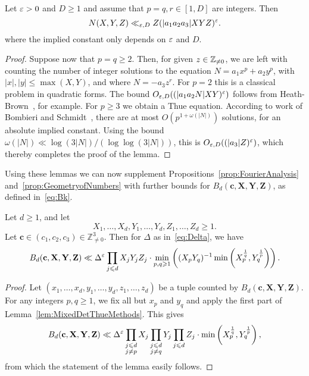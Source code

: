 \begin{lemma}\label{lem:MixedThueMethods}
  Let $\varepsilon>0$ and $D\geq 1$ and
  assume that $p=q,r\in [1,D]$ are integers. Then
  \[
  N(X,Y,Z)\ll_{\varepsilon,D} Z (|a_1a_2a_3|XYZ)^\varepsilon.
  \]
  where the implied constant only depends on $\varepsilon$ and $D$.
  \end{lemma}
\begin{proof}
 Suppose now that $p=q\geq 2$. Then, for given $z\in \mathbb{Z}_{\neq 0}$, we are left with counting the number of integer solutions to the equation $N=a_1x^p+a_2y^p$, with $|x|,|y|\leq \max(X,Y)$, and
 where $N=-a_3z^r$. For $p=2$ this is a classical problem in quadratic forms. The
bound $O_{\varepsilon,D}((|a_1a_2N|XY)^\varepsilon)$ follows from Heath-Brown~\cite[Theorem~3]{cubic}, for example.
 For $p\geq 3$ we obtain a Thue equation. According to work of Bombieri and Schmidt~\cite{bs}, there are at most $O(p^{1+\omega(|N|)})$ solutions, for an absolute implied constant. Using the bound $\omega(|N|)\ll \log(3|N|)/(\log \log(3|N|))$, this is $O_{\varepsilon,D}((|a_3|Z)^\varepsilon)$, which thereby completes the proof of the lemma.
 \end{proof}


Using these lemmas we can now supplement Propositions~\ref{prop:FourierAnalysis}
and~\ref{prop:GeometryofNumbers} with further bounds
for $B_d(\mathbf{c},\mathbf{X},\mathbf{Y},\mathbf{Z})$, as defined in~\eqref{eq:Bk}.


\begin{proposition}\label{prop:DeterminantMethod}
Let $d\geq 1$, and let
\[
X_1,\ldots, X_d, Y_1,\ldots, Y_d,Z_1,\ldots, Z_d\geq 1.
\]
Let $\mathbf{c}\in (c_1,c_2,c_3)\in \mathbb{Z}_{\neq 0}^3$.
Then for $\Delta$ as in~\eqref{eq:Delta}, we have
\[
B_d(\mathbf{c},\mathbf{X},\mathbf{Y},\mathbf{Z}) \ll
\Delta^\varepsilon \prod_{j\leqslant d} X_j Y_j Z_j \cdot
\min_{p,q\geqslant 1}\left(
(X_p Y_q)^{-1}
\min\left( X_p^{\frac{1}{q}} , Y_q^{\frac{1}{p}}\right)\right).
\]
\end{proposition}


\begin{proof}
Let $(x_1,\ldots, x_d,y_1,\ldots, y_d,z_1,\ldots, z_d)$ be a tuple counted by $B_d(\mathbf{c},\mathbf{X},\mathbf{Y},\mathbf{Z})$.
For any integers $p,q\geq 1$, we fix all but $x_p$ and $y_q$ and apply
the first part of Lemma~\ref{lem:MixedDetThueMethods}. This gives
\[
B_d(\mathbf{c},\mathbf{X},\mathbf{Y},\mathbf{Z}) \ll
\Delta^\varepsilon \prod_{\substack{j\leqslant d\\ j\neq p }} X_j
\prod_{\substack{j\leqslant d\\ j\neq q }} Y_j
\prod_{\substack{j\leqslant d }} Z_j \cdot
\min\left( X_p^{\frac{1}{q}} , Y_q^{\frac{1}{p}}\right) ,
\]
from which the statement of the lemma easily follows.
\end{proof}





